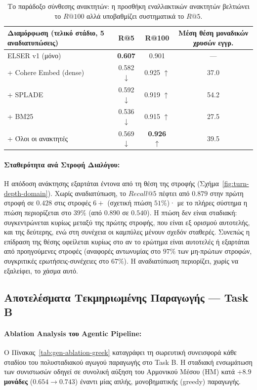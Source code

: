 \begin{table}[ht]
\centering
\small
\begin{tabular}{lccc}
\toprule
\textbf{Διαμόρφωση (τελικό στάδιο, 5 αναδιατυπώσεις)} & \textbf{R@5} & \textbf{R@100} & \textbf{Μέση θέση μοναδικών χρυσών εγγρ.} \\
\midrule
ELSER v1 (μόνο) & \textbf{0.607} & 0.901 & — \\
+ Cohere Embed (dense) & 0.582 $\downarrow$ & 0.925 $\uparrow$ & 37.0 \\
+ SPLADE & 0.592 $\downarrow$ & 0.919 $\uparrow$ & 54.2 \\
+ BM25 & 0.536 $\downarrow$ & 0.915 $\uparrow$ & 27.5 \\
+ Όλοι οι ανακτητές & 0.569 $\downarrow$ & \textbf{0.926} $\uparrow$ & 39.5 \\
\bottomrule
\end{tabular}
\caption{Το παράδοξο σύνθεσης ανακτητών: η προσθήκη εναλλακτικών ανακτητών βελτιώνει το $R@100$ αλλά υποβαθμίζει συστηματικά το $R@5$.}
\label{tab:ensemble-paradox-greek}
\end{table}

\paragraph{Σταθερότητα ανά Στροφή Διαλόγου:}
Η απόδοση ανάκτησης εξαρτάται έντονα από τη θέση της στροφής (Σχήμα~\ref{fig:turn-depth-domain}). Χωρίς αναδιατύπωση, το $Recall@5$ πέφτει από $0.879$ στην πρώτη στροφή σε $0.428$ στις στροφές $6+$ (σχετική πτώση $51\%$)· με το πλήρες σύστημα η πτώση περιορίζεται στο $39\%$ (από $0.890$ σε $0.540$). Η πτώση δεν είναι σταδιακή: συγκεντρώνεται κυρίως μεταξύ της πρώτης στροφής, που είναι εξ ορισμού αυτοτελής, και της δεύτερης, ενώ στη συνέχεια οι καμπύλες μένουν σχεδόν σταθερές. Συνεπώς η επίδραση της θέσης οφείλεται κυρίως στο αν το ερώτημα είναι αυτοτελές ή εξαρτάται από προηγούμενες στροφές (αναφορές αντωνυμίας στο $97\%$ των μη-πρώτων στροφών, συγκριτικές ερωτήσεις-συνέχειες στο $67\%$). Η αναδιατύπωση περιορίζει, χωρίς να εξαλείφει, το χάσμα αυτό.

\subsection{Αποτελέσματα Τεκμηριωμένης Παραγωγής — Task B}

\paragraph{Ablation Analysis του Agentic Pipeline:}
Ο Πίνακας~\ref{tab:gen-ablation-greek} καταγράφει τη σωρευτική συνεισφορά κάθε σταδίου του πολυσταδιακού αγωγού παραγωγής στο Task B. Η σταδιακή ενσωμάτωση των συνιστωσών οδηγεί σε συνολική αύξηση του Αρμονικού Μέσου (HM) κατά \textbf{$+8.9$ μονάδες} ($0.654 \rightarrow 0.743$) έναντι μίας απλής, μονοβηματικής (greedy) παραγωγής.

